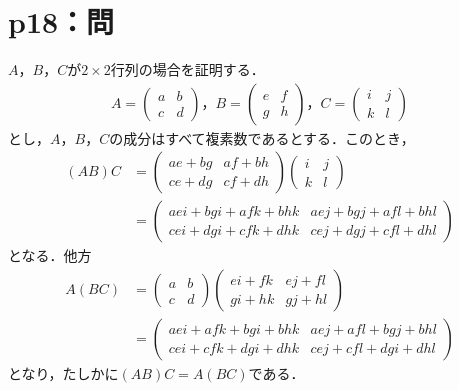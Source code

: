 %
%
%
\section*{p18：問}

\begin{tproof}
  $A$，$B$，$C$が$2 \times 2$行列の場合を証明する．
  \begin{gather*}
    A=
    \begin{pmatrix}
      a & b \\
      c & d
    \end{pmatrix}
    ，
    B=
    \begin{pmatrix}
      e & f \\
      g & h
    \end{pmatrix}
    ，C=
    \begin{pmatrix}
      i & j \\
      k & l
    \end{pmatrix}
  \end{gather*}
  とし，$A$，$B$，$C$の成分はすべて複素数であるとする．このとき，
  \begin{align*}
    (AB)C & =
    \begin{pmatrix}
      ae+bg & af+bh \\
      ce+dg & cf+dh
    \end{pmatrix}
    \begin{pmatrix}
      i & j \\
      k & l
    \end{pmatrix}
    \\
          & =
    \begin{pmatrix}
      aei +bgi +afk +bhk & aej+bgj+afl+bhl     \\
      cei +dgi+cfk +dhk  & cej +dgj + cfl +dhl
    \end{pmatrix}
  \end{align*}
  となる．他方
  \begin{align*}
    A(BC) & =
    \begin{pmatrix}
      a & b \\
      c & d
    \end{pmatrix}
    \begin{pmatrix}
      ei + fk & ej +fl \\
      gi + hk & gj +hl
    \end{pmatrix}
    \\
          & =
    \begin{pmatrix}
      aei + afk +bgi +bhk  & aej +afl +bgj +bhl   \\
      cei + cfk + dgi +dhk & cej + cfl + dgi +dhl
    \end{pmatrix}
  \end{align*}
  となり，たしかに$(AB)C=A(BC)$である．
\end{tproof}
%

